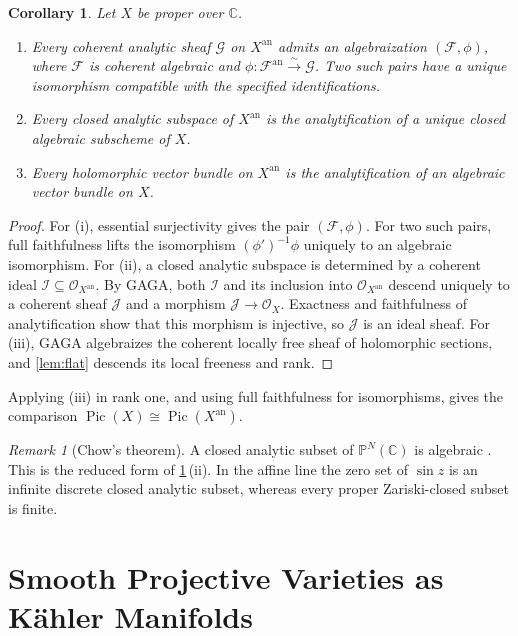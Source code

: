 \documentclass[11pt,reqno]{amsart}
\newtheorem{corollary}[theorem]{Corollary}
\theoremstyle{definition}
\theoremstyle{remark}
\newtheorem{remark}[theorem]{Remark}
\newcommand{\C}{\mathbb{C}}
\newcommand{\PP}{\mathbb{P}}
\newcommand{\OO}{\mathcal{O}}
\newcommand{\Xan}{X^{\mathrm{an}}}
\newcommand{\Fan}{\mathcal{F}^{\mathrm{an}}}
\DeclareMathOperator{\Pic}{Pic}
\begin{document}
\begin{corollary}
\label{cor:gaga}
Let $X$ be proper over $\C$.
\begin{enumerate}
  \item Every coherent analytic sheaf $\mathcal G$ on $\Xan$ admits an
  algebraization $(\mathcal F,\phi)$, where $\mathcal F$ is coherent algebraic
  and $\phi:\Fan\xrightarrow{\sim}\mathcal G$. Two such pairs have a unique
  isomorphism compatible with the specified identifications.
  \item Every closed analytic subspace of $\Xan$ is the analytification of a
  unique closed algebraic subscheme of $X$.
  \item Every holomorphic vector bundle on $\Xan$ is the analytification of an
  algebraic vector bundle on $X$.
\end{enumerate}
\end{corollary}

\begin{proof}
For (i), essential surjectivity gives the pair $(\mathcal F,\phi)$. For two
such pairs, full faithfulness lifts the isomorphism
$(\phi')^{-1}\phi$ uniquely to an algebraic isomorphism. For (ii), a closed
analytic subspace is determined by a coherent ideal
$\mathcal I\subseteq\OO_{\Xan}$. By GAGA, both $\mathcal I$ and its inclusion
into $\OO_{\Xan}$ descend uniquely to a coherent sheaf $\mathcal J$ and a
morphism $\mathcal J\to\OO_X$. Exactness and faithfulness of analytification
show that this morphism is injective, so $\mathcal J$ is an ideal sheaf. For
(iii), GAGA algebraizes the coherent locally free sheaf of holomorphic
sections, and \cref{lem:flat} descends its local freeness and rank.
\end{proof}

Applying (iii) in rank one, and using full faithfulness for isomorphisms,
gives the comparison $\Pic(X)\cong\Pic(\Xan)$.

\begin{remark}[Chow's theorem]
\label{rem:chow}
A closed analytic subset of $\PP^N(\C)$ is algebraic \cite{chow1949}. This is
the reduced form of \cref{cor:gaga}\,(ii). In the affine line the zero set
of $\sin z$ is an infinite discrete closed analytic subset, whereas every
proper Zariski-closed subset is finite.
\end{remark}

\section{Smooth Projective Varieties as K\"ahler Manifolds}
\label{sec:kahler}
\end{document}
